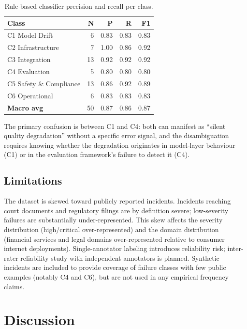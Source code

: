 \documentclass{article}
\begin{document}
\begin{table}[h]
\caption{Rule-based classifier precision and recall per class.}
\label{tab:classifier}
\centering
\small
\begin{tabular}{lrrrr}
\toprule
\textbf{Class} & \textbf{N} & \textbf{P} & \textbf{R} & \textbf{F1} \\
\midrule
C1 Model Drift           & 6  & 0.83 & 0.83 & 0.83 \\
C2 Infrastructure        & 7  & 1.00 & 0.86 & 0.92 \\
C3 Integration           & 13 & 0.92 & 0.92 & 0.92 \\
C4 Evaluation            & 5  & 0.80 & 0.80 & 0.80 \\
C5 Safety \& Compliance  & 13 & 0.86 & 0.92 & 0.89 \\
C6 Operational           & 6  & 0.83 & 0.83 & 0.83 \\
\midrule
\textbf{Macro avg}       & 50 & 0.87 & 0.86 & 0.87 \\
\bottomrule
\end{tabular}
\end{table}

The primary confusion is between C1 and C4: both can manifest as ``silent
quality degradation'' without a specific error signal, and the disambiguation
requires knowing whether the degradation originates in model-layer behaviour
(C1) or in the evaluation framework's failure to detect it (C4).

\subsection{Limitations}

The dataset is skewed toward publicly reported incidents.  Incidents reaching
court documents and regulatory filings are by definition severe; low-severity
failures are substantially under-represented.  This skew affects the severity
distribution (high/critical over-represented) and the domain distribution
(financial services and legal domains over-represented relative to consumer
internet deployments).  Single-annotator labeling introduces reliability risk;
inter-rater reliability study with independent annotators is planned.
Synthetic incidents are included to provide coverage of failure classes with
few public examples (notably C4 and C6), but are not used in any empirical
frequency claims.

\section{Discussion}
\label{sec:discussion}
\end{document}
